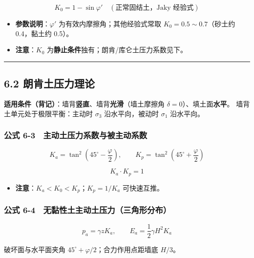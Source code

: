 \documentclass[
]{article}
\providecommand{\tightlist}{%
  \setlength{\itemsep}{0pt}\setlength{\parskip}{0pt}}
\begin{document}
\[K_0=1-\sin\varphi'\quad(\text{正常固结土，Jaky 经验式})\]

\begin{itemize}
\tightlist
\item
  \textbf{参数说明}：\(\varphi'\) 为有效内摩擦角；其他经验式常取
  \(K_0=0.5\sim0.7\)（砂土约 0.4，黏土约 0.5）。
\item
  \textbf{注意}：\(K_0\)
  为\textbf{静止条件}独有；朗肯/库仑土压力系数见下。
\end{itemize}

\begin{center}\rule{0.5\linewidth}{0.5pt}\end{center}

\subsection{6.2
朗肯土压力理论}\label{ux6717ux80afux571fux538bux529bux7406ux8bba}

\textbf{适用条件（背记）}：墙背\textbf{竖直}、墙背\textbf{光滑}（墙土摩擦角
\(\delta=0\)）、填土面\textbf{水平}。 墙背土单元处于极限平衡：主动时
\(\sigma_3\) 沿水平向，被动时 \(\sigma_1\) 沿水平向。

\subsubsection{公式
6-3　主动土压力系数与被主动系数}\label{ux516cux5f0f-6-3-ux4e3bux52a8ux571fux538bux529bux7cfbux6570ux4e0eux88abux4e3bux52a8ux7cfbux6570}

\[K_a=\tan^2\left(45^{\circ}-\frac{\varphi}{2}\right),\qquad K_p=\tan^2\left(45^{\circ}+\frac{\varphi}{2}\right)\]

\[K_a\cdot K_p=1\]

\begin{itemize}
\tightlist
\item
  \textbf{注意}：\(K_a<K_0<K_p\)；\(K_p=1/K_a\) 可快速互推。
\end{itemize}

\subsubsection{公式
6-4　无黏性土主动土压力（三角形分布）}\label{ux516cux5f0f-6-4-ux65e0ux9ecfux6027ux571fux4e3bux52a8ux571fux538bux529bux4e09ux89d2ux5f62ux5206ux5e03}

\[p_a=\gamma zK_a,\qquad E_a=\frac{1}{2}\gamma H^2K_a\]

破坏面与水平面夹角 \(45^{\circ}+\varphi/2\)；合力作用点距墙底 \(H/3\)。
\end{document}

